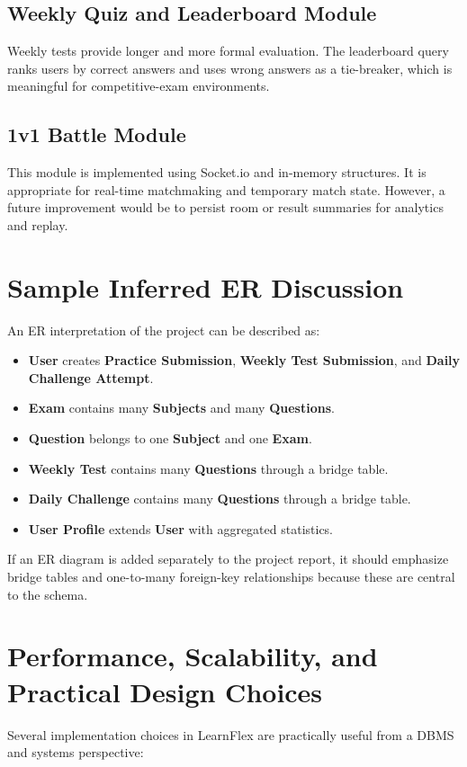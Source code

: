 \documentclass[12pt,a4paper]{article}
\begin{document}
\subsection{Weekly Quiz and Leaderboard Module}
Weekly tests provide longer and more formal evaluation. The leaderboard query ranks users by correct answers and uses wrong answers as a tie-breaker, which is meaningful for competitive-exam environments.

\subsection{1v1 Battle Module}
This module is implemented using Socket.io and in-memory structures. It is appropriate for real-time matchmaking and temporary match state. However, a future improvement would be to persist room or result summaries for analytics and replay.

\section{Sample Inferred ER Discussion}
An ER interpretation of the project can be described as:

\begin{itemize}[leftmargin=1.5em]
  \item \textbf{User} creates \textbf{Practice Submission}, \textbf{Weekly Test Submission}, and \textbf{Daily Challenge Attempt}.
  \item \textbf{Exam} contains many \textbf{Subjects} and many \textbf{Questions}.
  \item \textbf{Question} belongs to one \textbf{Subject} and one \textbf{Exam}.
  \item \textbf{Weekly Test} contains many \textbf{Questions} through a bridge table.
  \item \textbf{Daily Challenge} contains many \textbf{Questions} through a bridge table.
  \item \textbf{User Profile} extends \textbf{User} with aggregated statistics.
\end{itemize}

If an ER diagram is added separately to the project report, it should emphasize bridge tables and one-to-many foreign-key relationships because these are central to the schema.

\section{Performance, Scalability, and Practical Design Choices}
Several implementation choices in LearnFlex are practically useful from a DBMS and systems perspective:
\end{document}
